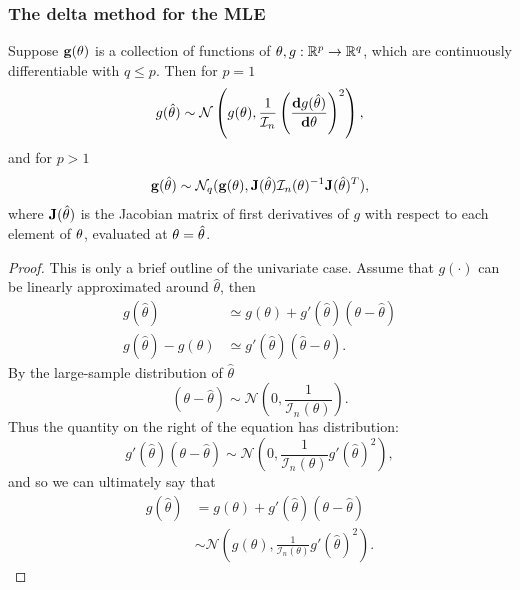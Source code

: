 \documentclass[10pt, a4paper]{article}
\begin{document}
\subsubsection{The delta method for the MLE}

\begin{proposition}
    Suppose $\mathbf{g}(\mathbf{\theta})$ is a collection of functions of $\mathbf{\theta}, g : \mathbb{R} ^ p \to \mathbb{R} ^ q$,
    which are continuously differentiable with $q \leq p$.
    Then for $p = 1$
    \[
    g(\hat{\theta}) \sim \mathcal{N}\left(g(\theta), \frac{1}{\mathcal{I}_n}\left(\frac{\mathbf{d}g(\hat{\theta})}{\mathbf{d}\theta}\right) ^ 2\right),
    \]
    and for $p > 1$
    \[
    \mathbf{g}(\hat{\mathbf{\theta}}) \sim \mathcal{N}_q(\mathbf{g}(\mathbf{\theta}), \mathbf{J}(\hat{\mathbf{\theta}})\mathcal{I}_n(\theta) ^ {-1}\mathbf{J}(\hat{\mathbf{\theta}}) ^ T),
    \]
    where $\mathbf{J}(\hat{\mathbf{\theta}})$ is the Jacobian matrix of first derivatives of $g$ with respect to each element of $\mathbf{\theta}$,
    evaluated at $\mathbf{\theta} = \hat{\mathbf{\theta}}$.

    \begin{proof}
        This is only a brief outline of the univariate case.
        Assume that $g(\cdot)$ can be linearly approximated around $\hat{\theta}$,
        then
        \begin{align*}
            g(\hat{\theta}) &\simeq g(\theta) + g'(\hat{\theta})(\theta - \hat{\theta}) \\
            g(\hat{\theta}) - g(\theta) &\simeq g'(\hat{\theta})(\hat{\theta} - \theta).
        \end{align*}
        By the large-sample distribution of $\hat{\theta}$
        \[
        (\theta - \hat{\theta}) \sim \mathcal{N}\left(0, \frac{1}{\mathcal{I}_n(\theta)}\right).
        \]
        Thus the quantity on the right of the equation has distribution:
        \[
        g'(\hat{\theta})(\theta - \hat{\theta}) \sim \mathcal{N}\left(0, \frac{1}{\mathcal{I}_n(\theta)}g'(\hat{\theta}) ^ 2\right),
        \]
        and so we can ultimately say that
        \begin{align*}
            g(\hat{\theta}) &= g(\theta) + g'(\hat{\theta})(\theta - \hat{\theta}) \\
            &\sim \mathcal{N}\left(g(\theta), \frac{1}{\mathcal{I}_n(\theta)}g'(\hat{\theta}) ^ 2\right).
        \end{align*}
    \end{proof}
\end{proposition}
\end{document}
